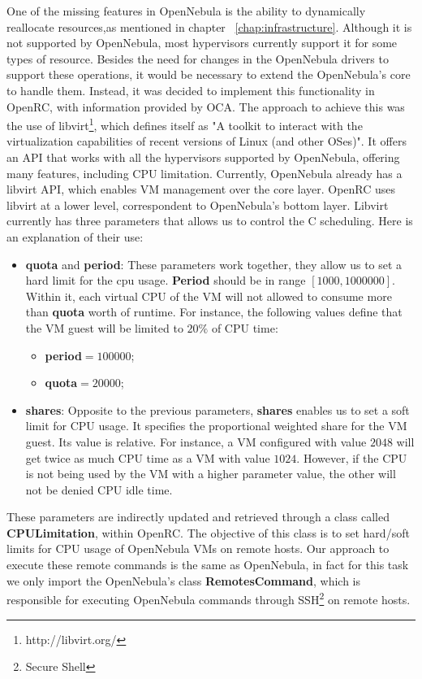 One of the missing features in OpenNebula is the ability to dynamically reallocate resources,as mentioned in chapter ~\ref{chap:infrastructure}. Although it is not supported by OpenNebula, most hypervisors currently support it for some types of resource. Besides the need for changes in the OpenNebula drivers to support these operations, it would be necessary to extend the OpenNebula's core to handle them. Instead, it was decided to implement this functionality in OpenRC, with information provided by OCA. The approach to achieve this  was the use of libvirt\footnote{http://libvirt.org/}, which defines itself as "A toolkit to interact with the virtualization capabilities of recent versions of Linux (and other OSes)". It offers an API that works with all the hypervisors supported by OpenNebula, offering many features, including CPU limitation. Currently, OpenNebula already has a libvirt API, which enables VM management over the core layer. OpenRC uses libvirt at a lower level, correspondent to OpenNebula's 
bottom layer. Libvirt currently has three parameters that allows us to control the C scheduling. Here is an explanation of their use:
\begin{itemize}
 \item \textbf{quota} and \textbf{period}: These parameters work together, they allow us to set a hard limit for the cpu usage. \textbf{Period} should be in range $[1000, 1000000]$. Within it, each virtual CPU of the VM will not allowed to consume more than \textbf{quota} worth of runtime. For instance, the following values define that the VM guest will be limited to $20\%$ of CPU time:
  \begin{itemize}
   \item  \textbf{period}$=100000$; 
   \item \textbf{quota}$=20000$;
  \end{itemize}
  \item \textbf{shares}: Opposite to the previous parameters, \textbf{shares} enables us to set a soft limit for CPU usage. It specifies the proportional weighted share for the VM guest. Its value is relative. For instance, a VM configured with value $2048$ will get twice as much CPU time as a VM with value $1024$. However, if the CPU is not being used by the VM with a higher parameter value, the other will not be denied CPU idle time.
\end{itemize}

These parameters are indirectly updated and retrieved through a class called \textbf{CPULimitation}, within OpenRC. The objective of this class is to set hard/soft limits for CPU usage of OpenNebula VMs on remote hosts. Our approach to execute these remote commands  is the same as OpenNebula, in fact for this task we only import the OpenNebula's class \textbf{RemotesCommand}, which is responsible for executing OpenNebula commands through SSH\footnote{Secure Shell} on remote hosts.

